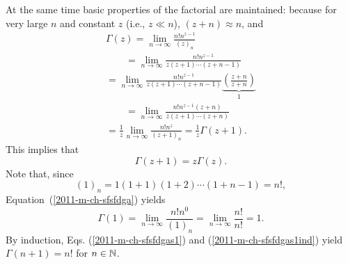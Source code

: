 At the same time basic properties of the factorial are maintained:
because for very large $n$ and constant $z$ (i.e., $z\ll n$),
$(z+n)\approx n$, and
\begin{equation}
\begin{split}
\Gamma ( z  )
=  \lim_{ n \rightarrow \infty} \frac{ n !  n ^ { z -1}  }{  ( z )_n }
\\ \qquad
=  \lim_{ n \rightarrow \infty} \frac{ n !  n ^ { z -1}  }{  z(z+1)\cdots (z+n-1) }
\\
=
\lim_{ n \rightarrow \infty} \frac{ n !  n ^ { z -1}  }{  z(z+1)\cdots (z+n-1) }
\underbrace{\left(\frac{z+n}{z+n}\right)}_{1}
\\ \qquad
=
\lim_{ n \rightarrow \infty} \frac{ n !  n ^ { z -1} (z+n) }{  z(z+1)\cdots (z+n) }
\\
=
\frac{1}{z} \lim_{ n \rightarrow \infty} \frac{ n !  n ^ z  }{  ( z +1)_n }
=
\frac{1}{z} \Gamma ( z +1 )
.
\label{2011-m-ch-sfsfdga234}
\end{split}
\end{equation}
This implies that
\begin{equation}
\Gamma ( z + 1)
=  z
\Gamma ( z  ) .
\label{2011-m-ch-sfsfdgas1ind}
\end{equation}
Note that, since
\begin{equation}
(1)_n =1 (1+1) (1+2)\cdots (1+n-1)= n! ,
\end{equation}
Equation~(\ref{2011-m-ch-sfsfdga})  yields
\begin{equation}
\Gamma ( 1)
=  \lim_{ n \rightarrow \infty} \frac{ n !  n ^ 0  }{  (  1)_ n }
=  \lim_{ n \rightarrow \infty} \frac{ n !    }{  n !}  =1
.
\label{2011-m-ch-sfsfdgas1}
\end{equation}
By induction, Eqs.
(\ref{2011-m-ch-sfsfdgas1})
and
(\ref{2011-m-ch-sfsfdgas1ind})
yield
$\Gamma ( n +1 ) =n!$ for $n\in {\Bbb N}$.

